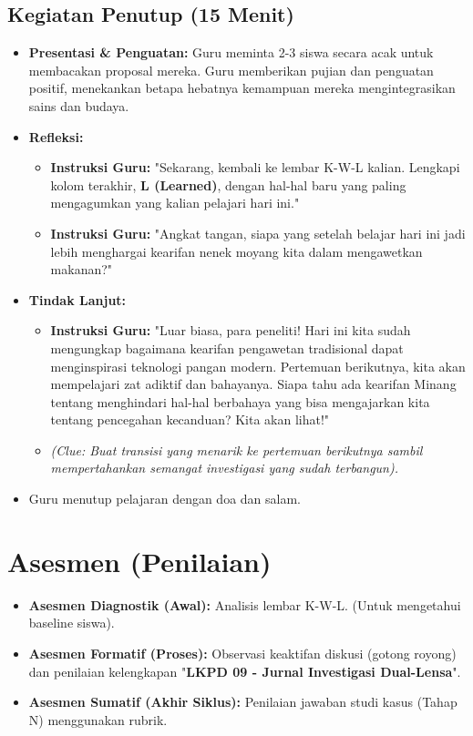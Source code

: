 \documentclass[a4paper,12pt]{article}
\begin{document}
\subsection{Kegiatan Penutup (15 Menit)}
\begin{itemize}
\item \textbf{Presentasi \& Penguatan:} Guru meminta 2-3 siswa secara acak untuk membacakan proposal mereka. Guru memberikan pujian dan penguatan positif, menekankan betapa hebatnya kemampuan mereka mengintegrasikan sains dan budaya.
\item \textbf{Refleksi:}
    \begin{itemize}
    \item \textbf{Instruksi Guru:} "Sekarang, kembali ke lembar K-W-L kalian. Lengkapi kolom terakhir, \textbf{L (Learned)}, dengan hal-hal baru yang paling mengagumkan yang kalian pelajari hari ini."
    \item \textbf{Instruksi Guru:} "Angkat tangan, siapa yang setelah belajar hari ini jadi lebih menghargai kearifan nenek moyang kita dalam mengawetkan makanan?"
    \end{itemize}
\item \textbf{Tindak Lanjut:}
    \begin{itemize}
    \item \textbf{Instruksi Guru:} "Luar biasa, para peneliti! Hari ini kita sudah mengungkap bagaimana kearifan pengawetan tradisional dapat menginspirasi teknologi pangan modern. Pertemuan berikutnya, kita akan mempelajari zat adiktif dan bahayanya. Siapa tahu ada kearifan Minang tentang menghindari hal-hal berbahaya yang bisa mengajarkan kita tentang pencegahan kecanduan? Kita akan lihat!"
    \item \textit{(Clue: Buat transisi yang menarik ke pertemuan berikutnya sambil mempertahankan semangat investigasi yang sudah terbangun).}
    \end{itemize}
\item Guru menutup pelajaran dengan doa dan salam.
\end{itemize}

\section{Asesmen (Penilaian)}

\begin{itemize}
\item \textbf{Asesmen Diagnostik (Awal):} Analisis lembar K-W-L. (Untuk mengetahui baseline siswa).
\item \textbf{Asesmen Formatif (Proses):} Observasi keaktifan diskusi (gotong royong) dan penilaian kelengkapan "\textbf{LKPD 09 - Jurnal Investigasi Dual-Lensa}".
\item \textbf{Asesmen Sumatif (Akhir Siklus):} Penilaian jawaban studi kasus (Tahap N) menggunakan rubrik.
\end{itemize}
\end{document}
